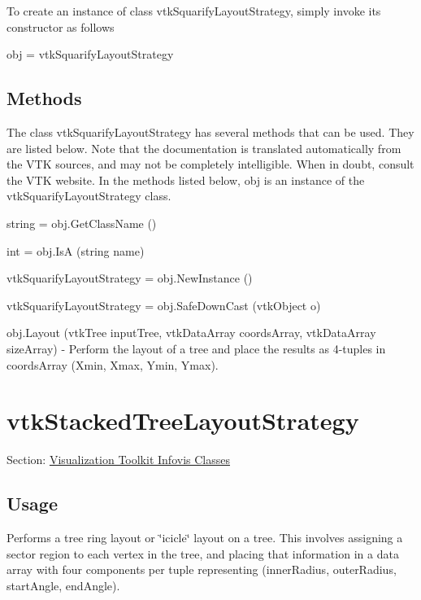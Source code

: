 To create an instance of class vtk\-Squarify\-Layout\-Strategy, simply invoke its constructor as follows \begin{DoxyVerb}  obj = vtkSquarifyLayoutStrategy
\end{DoxyVerb}
 \hypertarget{vtkwidgets_vtkxyplotwidget_Methods}{}\subsection{Methods}\label{vtkwidgets_vtkxyplotwidget_Methods}
The class vtk\-Squarify\-Layout\-Strategy has several methods that can be used. They are listed below. Note that the documentation is translated automatically from the V\-T\-K sources, and may not be completely intelligible. When in doubt, consult the V\-T\-K website. In the methods listed below, {\ttfamily obj} is an instance of the vtk\-Squarify\-Layout\-Strategy class. 
\begin{DoxyItemize}
\item {\ttfamily string = obj.\-Get\-Class\-Name ()}  
\item {\ttfamily int = obj.\-Is\-A (string name)}  
\item {\ttfamily vtk\-Squarify\-Layout\-Strategy = obj.\-New\-Instance ()}  
\item {\ttfamily vtk\-Squarify\-Layout\-Strategy = obj.\-Safe\-Down\-Cast (vtk\-Object o)}  
\item {\ttfamily obj.\-Layout (vtk\-Tree input\-Tree, vtk\-Data\-Array coords\-Array, vtk\-Data\-Array size\-Array)} -\/ Perform the layout of a tree and place the results as 4-\/tuples in coords\-Array (Xmin, Xmax, Ymin, Ymax).  
\end{DoxyItemize}\hypertarget{vtkinfovis_vtkstackedtreelayoutstrategy}{}\section{vtk\-Stacked\-Tree\-Layout\-Strategy}\label{vtkinfovis_vtkstackedtreelayoutstrategy}
Section\-: \hyperlink{sec_vtkinfovis}{Visualization Toolkit Infovis Classes} \hypertarget{vtkwidgets_vtkxyplotwidget_Usage}{}\subsection{Usage}\label{vtkwidgets_vtkxyplotwidget_Usage}
Performs a tree ring layout or \char`\"{}icicle\char`\"{} layout on a tree. This involves assigning a sector region to each vertex in the tree, and placing that information in a data array with four components per tuple representing (inner\-Radius, outer\-Radius, start\-Angle, end\-Angle).

